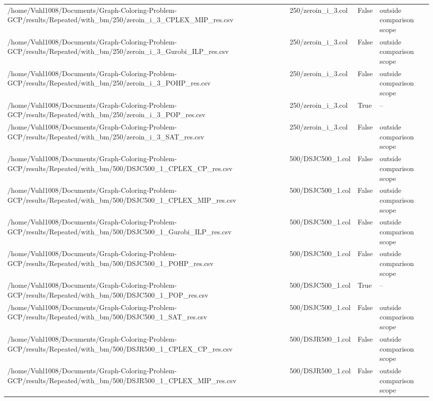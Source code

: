 \begin{table}[htbp]
\begin{tabular}{llll}
/home/Vuhl1008/Documents/Graph-Coloring-Problem-GCP/results/Repeated/with\_bm/250/zeroin\_i\_3\_CPLEX\_MIP\_res.csv & 250/zeroin\_i\_3.col & False & outside comparison scope \\
/home/Vuhl1008/Documents/Graph-Coloring-Problem-GCP/results/Repeated/with\_bm/250/zeroin\_i\_3\_Gurobi\_ILP\_res.csv & 250/zeroin\_i\_3.col & False & outside comparison scope \\
/home/Vuhl1008/Documents/Graph-Coloring-Problem-GCP/results/Repeated/with\_bm/250/zeroin\_i\_3\_POHP\_res.csv & 250/zeroin\_i\_3.col & False & outside comparison scope \\
/home/Vuhl1008/Documents/Graph-Coloring-Problem-GCP/results/Repeated/with\_bm/250/zeroin\_i\_3\_POP\_res.csv & 250/zeroin\_i\_3.col & True & -- \\
/home/Vuhl1008/Documents/Graph-Coloring-Problem-GCP/results/Repeated/with\_bm/250/zeroin\_i\_3\_SAT\_res.csv & 250/zeroin\_i\_3.col & False & outside comparison scope \\
/home/Vuhl1008/Documents/Graph-Coloring-Problem-GCP/results/Repeated/with\_bm/500/DSJC500\_1\_CPLEX\_CP\_res.csv & 500/DSJC500\_1.col & False & outside comparison scope \\
/home/Vuhl1008/Documents/Graph-Coloring-Problem-GCP/results/Repeated/with\_bm/500/DSJC500\_1\_CPLEX\_MIP\_res.csv & 500/DSJC500\_1.col & False & outside comparison scope \\
/home/Vuhl1008/Documents/Graph-Coloring-Problem-GCP/results/Repeated/with\_bm/500/DSJC500\_1\_Gurobi\_ILP\_res.csv & 500/DSJC500\_1.col & False & outside comparison scope \\
/home/Vuhl1008/Documents/Graph-Coloring-Problem-GCP/results/Repeated/with\_bm/500/DSJC500\_1\_POHP\_res.csv & 500/DSJC500\_1.col & False & outside comparison scope \\
/home/Vuhl1008/Documents/Graph-Coloring-Problem-GCP/results/Repeated/with\_bm/500/DSJC500\_1\_POP\_res.csv & 500/DSJC500\_1.col & True & -- \\
/home/Vuhl1008/Documents/Graph-Coloring-Problem-GCP/results/Repeated/with\_bm/500/DSJC500\_1\_SAT\_res.csv & 500/DSJC500\_1.col & False & outside comparison scope \\
/home/Vuhl1008/Documents/Graph-Coloring-Problem-GCP/results/Repeated/with\_bm/500/DSJR500\_1\_CPLEX\_CP\_res.csv & 500/DSJR500\_1.col & False & outside comparison scope \\
/home/Vuhl1008/Documents/Graph-Coloring-Problem-GCP/results/Repeated/with\_bm/500/DSJR500\_1\_CPLEX\_MIP\_res.csv & 500/DSJR500\_1.col & False & outside comparison scope \\

\end{tabular}
\end{table}
